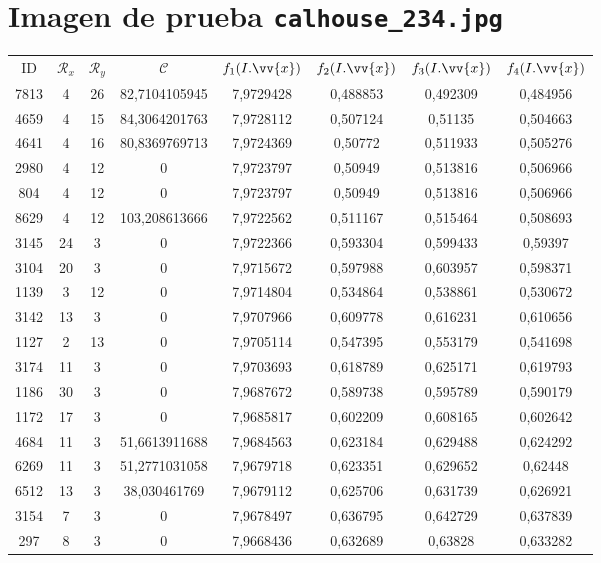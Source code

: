 \section{Imagen de prueba \texttt{calhouse\_234.jpg}}

\scriptsize
\begin{longtable}{|c|c|c|c|c|c|c|c|}
\hline
ID & $\mathscr{R}_x$ & $\mathscr{R}_y$ & $\mathscr{C}$ & $f_1(I.\vv{x})$ & $f_2(I.\vv{x})$ & $f_3(I.\vv{x})$ & $f_4(I.\vv{x})$ \\
7813 & 4 & 26 & 82,7104105945 & 7,9729428 & 0,488853 & 0,492309 & 0,484956 \\
4659 & 4 & 15 & 84,3064201763 & 7,9728112 & 0,507124 & 0,51135 & 0,504663 \\
4641 & 4 & 16 & 80,8369769713 & 7,9724369 & 0,50772 & 0,511933 & 0,505276 \\
2980 & 4 & 12 & 0 & 7,9723797 & 0,50949 & 0,513816 & 0,506966 \\
804 & 4 & 12 & 0 & 7,9723797 & 0,50949 & 0,513816 & 0,506966 \\
8629 & 4 & 12 & 103,208613666 & 7,9722562 & 0,511167 & 0,515464 & 0,508693 \\
3145 & 24 & 3 & 0 & 7,9722366 & 0,593304 & 0,599433 & 0,59397 \\
3104 & 20 & 3 & 0 & 7,9715672 & 0,597988 & 0,603957 & 0,598371 \\
1139 & 3 & 12 & 0 & 7,9714804 & 0,534864 & 0,538861 & 0,530672 \\
3142 & 13 & 3 & 0 & 7,9707966 & 0,609778 & 0,616231 & 0,610656 \\
1127 & 2 & 13 & 0 & 7,9705114 & 0,547395 & 0,553179 & 0,541698 \\
3174 & 11 & 3 & 0 & 7,9703693 & 0,618789 & 0,625171 & 0,619793 \\
1186 & 30 & 3 & 0 & 7,9687672 & 0,589738 & 0,595789 & 0,590179 \\
1172 & 17 & 3 & 0 & 7,9685817 & 0,602209 & 0,608165 & 0,602642 \\
4684 & 11 & 3 & 51,6613911688 & 7,9684563 & 0,623184 & 0,629488 & 0,624292 \\
6269 & 11 & 3 & 51,2771031058 & 7,9679718 & 0,623351 & 0,629652 & 0,62448 \\
6512 & 13 & 3 & 38,030461769 & 7,9679112 & 0,625706 & 0,631739 & 0,626921 \\
3154 & 7 & 3 & 0 & 7,9678497 & 0,636795 & 0,642729 & 0,637839 \\
297 & 8 & 3 & 0 & 7,9668436 & 0,632689 & 0,63828 & 0,633282 \\

\end{longtable}
